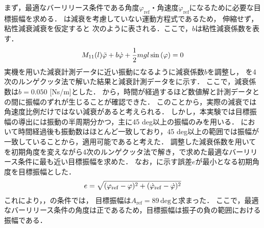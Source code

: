           まず，最適なバーリリース条件である角度$\varphi_{\mathrm{ref}}$・角速度$\dot{\varphi}_{\mathrm{ref}}$になるために必要な目標振幅を求める．
          は減衰を考慮していない運動方程式であるため，
          伸縮せず，粘性減衰減衰を仮定すると
          次のように表される．ここで，$b$は粘性減衰係数を表す．
          \begin{eqnarray}
            \equlabel{dampingEquation}
            M_{11}(l)\ddot{\varphi}+b\dot{\varphi}+\frac{1}{2}mgl\sin{(\varphi)}=0          
            \end{eqnarray}
          実機を用いた減衰計測データに近い振動になるように減衰係数$b$を調整し，
          を4次のルンゲクッタ法で解いた結果と減衰計測データをに示す．
          ここで，減衰係数は$b=0.050$ [Ns/m]とした．
          から，時間が経過するほど数値解と計測データとの間に振幅のずれが生じることが確認できた．
          このことから，実際の減衰では角速度比例だけではない減衰があると考えられる．
          しかし，本実験では目標振幅の導出には振動の半周期分かつ，主に45 deg以上の振幅のみを用いる．
          において時間経過後も振動数はほとんど一致しており，45 deg以上の範囲では振幅が一致していることから，適用可能であると考えた．
          調整した減衰係数を用いてを初期角度を変えながら4次のルンゲクッタ法で解き，で求めた最適なバーリリース条件に最も近い目標振幅を求めた．
          なお，に示す誤差$e$が最小となる初期角度を目標振幅とした．
          \begin{eqnarray}
            \equlabel{error}
            e=\sqrt{(\varphi_{\mathrm{ref}}-\varphi)^2+(\dot{\varphi}_{\mathrm{ref}}-\dot{\varphi})^2}
            \end{eqnarray}
          これにより，，の条件では，
          目標振幅は$A_{\mathrm{ref}}=89\,\mathrm{deg}$と求まった．
          ここで，最適なバーリリース条件の角度は正であるため，目標振幅は振子の負の範囲における振幅である．

        





          



